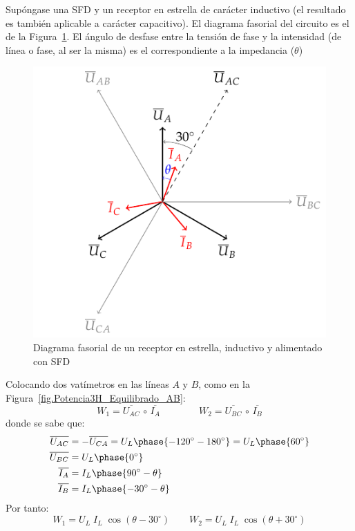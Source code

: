 \documentclass[11pt]{book} %
\begin{document}
	Supóngase una SFD y un receptor en estrella de carácter inductivo (el resultado es también aplicable a carácter capacitivo). El diagrama fasorial del circuito es el de la Figura~\ref{fig.fasores_potencia3H}. El ángulo de desfase entre la tensión de fase y la intensidad (de línea o fase, al ser la misma) es el correspondiente a la impedancia ($\theta$)
	\begin{figure}[htbp]
	    \centering
	    \includegraphics{../figs/fasores_potencia3H.pdf}
	    \caption{Diagrama fasorial de un receptor en estrella, inductivo y alimentado con SFD}
	    \label{fig.fasores_potencia3H}
	\end{figure}
	
	Colocando dos vatímetros en las líneas $A$ y $B$, como en la Figura~\ref{fig.Potencia3H_Equilibrado_AB}:
	\begin{equation*}
	    W_1=\overline{U_{AC}}\,\circ\,\overline{I_A}\qquad\qquad W_2=\overline{U_{BC}}\,\circ\,\overline{I_B}
	\end{equation*}
	donde se sabe que:
	\begin{align*}
	   \overline{U_{AC}}&=-\overline{U_{CA}}=U_L\phase{-120^\circ-180^\circ}=U_L\phase{60^\circ}\\ \overline{U_{BC}}&=U_L\phase{0^\circ}\\ \overline{I_A}&=I_L\phase{90^\circ-\theta}\\ \overline{I_B}&=I_L\phase{-30^\circ-\theta} 
	\end{align*}
	Por tanto: 
	\begin{equation*}
	    W_1=U_L\;I_L\;\cos{(\theta-30^\circ)}\qquad W_2={U_L}\; {I_L}\;\cos{(\theta+30^\circ)}
	\end{equation*}
	
\end{document}
